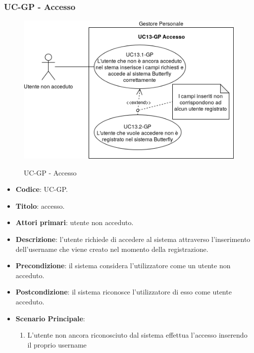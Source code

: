 \subsubsection{UC\theuccount-GP - Accesso}
		\begin{figure}[H]
			\centering
				\includegraphics[width=\columnwidth]{img/casi_d'uso/UC13.png}\\
			\caption{UC\theuccount-GP - Accesso}
		\end{figure}
	\begin{itemize}
		\item \textbf{Codice}: UC\theuccount-GP.
		\item \textbf{Titolo}: accesso.
		\item \textbf{Attori primari}: utente non acceduto.
		\item \textbf{Descrizione}: l'utente richiede di accedere al sistema attraverso l'inserimento dell'username che viene creato nel momento della registrazione.
		\item \textbf{Precondizione}: il sistema considera l’utilizzatore come un utente non acceduto.
		\item \textbf{Postcondizione}: il sistema riconosce l'utilizzatore di esso come utente acceduto.
		\item \textbf{Scenario Principale}:
		\begin{enumerate}
			\item L'utente non ancora riconosciuto dal sistema effettua l'accesso inserendo il proprio username
		\end{enumerate}
	\end{itemize}
	
